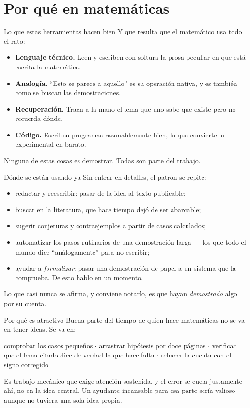 \documentclass[11pt,aspectratio=169]{beamer}
\begin{document}
\section{Por qué en matemáticas}

\begin{frame}{Lo que estas herramientas hacen bien}
  Y que resulta que el matemático usa todo el rato:
  \begin{itemize}
    \item \textbf{Lenguaje técnico.} Leen y escriben con soltura la prosa
          peculiar en que está escrita la matemática.
    \item \textbf{Analogía.} ``Esto se parece a aquello'' es su operación
          nativa, y es también como se buscan las demostraciones.
    \item \textbf{Recuperación.} Traen a la mano el lema que uno sabe que
          existe pero no recuerda dónde.
    \item \textbf{Código.} Escriben programas razonablemente bien, lo que
          convierte lo experimental en barato.
  \end{itemize}
  \vfill
  Ninguna de estas cosas es demostrar. Todas son parte del trabajo.
\end{frame}

\begin{frame}{Dónde se están usando ya}
  Sin entrar en detalles, el patrón se repite:
  \begin{itemize}
    \item redactar y reescribir: pasar de la idea al texto publicable;
    \item buscar en la literatura, que hace tiempo dejó de ser abarcable;
    \item sugerir conjeturas y contraejemplos a partir de casos calculados;
    \item automatizar los pasos rutinarios de una demostración larga ---
          los que todo el mundo dice ``análogamente'' para no escribir;
    \item ayudar a \emph{formalizar}: pasar una demostración de papel a un
          sistema que la comprueba. De esto hablo en un momento.
  \end{itemize}
  \vfill
  Lo que casi nunca se afirma, y conviene notarlo, es que hayan
  \emph{demostrado} algo por su cuenta.
\end{frame}

\begin{frame}{Por qué es atractivo}
  Buena parte del tiempo de quien hace matemáticas no se va en tener ideas.
  Se va en:
  \vfill
  \begin{center}
    comprobar los casos pequeños \quad$\cdot$\quad
    arrastrar hipótesis por doce páginas \quad$\cdot$\quad
    verificar que el lema citado dice de verdad lo que hace falta \quad$\cdot$\quad
    rehacer la cuenta con el signo corregido
  \end{center}
  \vfill
  Es trabajo mecánico que exige atención sostenida, y el error se cuela
  justamente ahí, no en la idea central.
  \vfill
  Un ayudante incansable para esa parte sería valioso aunque no tuviera una
  sola idea propia.
\end{frame}
\end{document}
